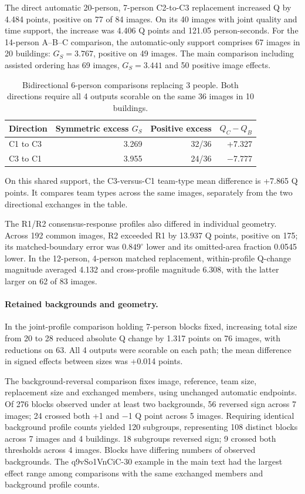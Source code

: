 The direct automatic 20-person, 7-person C2-to-C3 replacement increased Q by 4.484 points, positive on 77 of 84 images. On its 40 images with joint quality and time support, the increase was 4.406 Q points and 121.05 person-seconds. For the 14-person A--B--C comparison, the automatic-only support comprises 67 images in 20 buildings: $G_S=3.767$, positive on 49 images. The main comparison including assisted ordering has 69 images, $G_S=3.441$ and 50 positive image effects.

\begin{table}[ht]
\centering\small
\caption{Bidirectional 6-person comparisons replacing 3 people. Both directions require all 4 outputs scorable on the same 36 images in 10 buildings.}
\label{tab:bidirectional-half}
\begin{tabular}{lrrr}
\toprule
Direction & Symmetric excess $G_S$ & Positive excess & $Q_C-Q_B$\\
\midrule
C1 to C3 & 3.269 & 32/36 & +7.327\\
C3 to C1 & 3.955 & 24/36 & $-$7.777\\
\bottomrule
\end{tabular}
\end{table}
On this shared support, the C3-versus-C1 team-type mean difference is +7.865 Q points. It compares team types across the same images, separately from the two directional exchanges in the table.

The R1/R2 consensus-response profiles also differed in individual geometry. Across 192 common images, R2 exceeded R1 by 13.937 Q points, positive on 175; its matched-boundary error was $0.849^\circ$ lower and its omitted-area fraction 0.0545 lower. In the 12-person, 4-person matched replacement, within-profile Q-change magnitude averaged 4.132 and cross-profile magnitude 6.308, with the latter larger on 62 of 83 images.

\paragraph{Retained backgrounds and geometry.}
In the joint-profile comparison holding 7-person blocks fixed, increasing total size from 20 to 28 reduced absolute Q change by 1.317 points on 76 images, with reductions on 63. All 4 outputs were scorable on each path; the mean difference in signed effects between sizes was +0.014 points.

The background-reversal comparison fixes image, reference, team size, replacement size and exchanged members, using unchanged automatic endpoints. Of 276 blocks observed under at least two backgrounds, 56 reversed sign across 7 images; 24 crossed both +1 and $-$1 Q point across 5 images. Requiring identical background profile counts yielded 120 subgroups, representing 108 distinct blocks across 7 images and 4 buildings. 18 subgroups reversed sign; 9 crossed both thresholds across 4 images. Blocks have differing numbers of observed backgrounds. The q9vSo1VnCiC-30 example in the main text had the largest effect range among comparisons with the same exchanged members and background profile counts.

